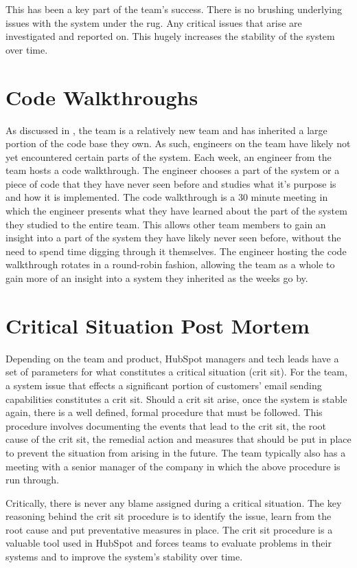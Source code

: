 This has been a key part of the \team{} team's success. There is no brushing underlying issues with the system under the rug. Any critical issues that arise are investigated and reported on. This hugely increases the stability of the system over time. 

\section{Code Walkthroughs}
As discussed in , the \team{} team is a relatively new team and has inherited a large portion of the code base they own. As such, engineers on the team have likely not yet encountered certain parts of the system. Each week, an engineer from the team hosts a code walkthrough. The engineer chooses a part of the system or a piece of code that they have never seen before and studies what it's purpose is and how it is implemented. The code walkthrough is a 30 minute meeting in which the engineer presents what they have learned about the part of the system they studied to the entire team. This allows other team members to gain an insight into a part of the system they have likely never seen before, without the need to spend time digging through it themselves. The engineer hosting the code walkthrough rotates in a round-robin fashion, allowing the team as a whole to gain more of an insight into a system they inherited as the weeks go by. 

\section{Critical Situation Post Mortem}
Depending on the team and product, HubSpot managers and tech leads have a set of parameters for what constitutes a critical situation (crit sit). For the \team{} team, a system issue that effects a significant portion of customers' email sending capabilities constitutes a crit sit. Should a crit sit arise, once the system is stable again, there is a well defined, formal procedure that must be followed. This procedure involves documenting the events that lead to the crit sit, the root cause of the crit sit, the remedial action and measures that should be put in place to prevent the situation from arising in the future. The team typically also has a meeting with a senior manager of the company in which the above procedure is run through.

Critically, there is never any blame assigned during a critical situation. The key reasoning behind the crit sit procedure is to identify the issue, learn from the root cause and put preventative measures in place. The crit sit procedure is a valuable tool used in HubSpot and forces teams to evaluate problems in their systems and to improve the system's stability over time.

